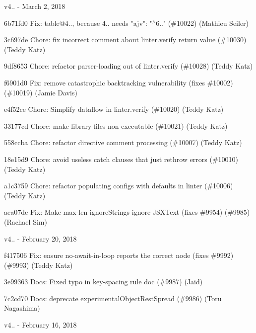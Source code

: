 v4.. -\/ March 2, 2018


\begin{DoxyItemize}
\item 6b71fd0 Fix\+: table@4.., because 4.. needs "{}ajv"{}\+: "{}\texorpdfstring{$^\wedge$}{\string^}6.."{} (\#10022) (Mathieu Seiler)
\item 3c697de Chore\+: fix incorrect comment about linter.\+verify return value (\#10030) (Teddy Katz)
\item 9df8653 Chore\+: refactor parser-\/loading out of linter.\+verify (\#10028) (Teddy Katz)
\item f6901d0 Fix\+: remove catastrophic backtracking vulnerability (fixes \#10002) (\#10019) (Jamie Davis)
\item e4f52ce Chore\+: Simplify dataflow in linter.\+verify (\#10020) (Teddy Katz)
\item 33177cd Chore\+: make library files non-\/executable (\#10021) (Teddy Katz)
\item 558ccba Chore\+: refactor directive comment processing (\#10007) (Teddy Katz)
\item 18e15d9 Chore\+: avoid useless catch clauses that just rethrow errors (\#10010) (Teddy Katz)
\item a1c3759 Chore\+: refactor populating configs with defaults in linter (\#10006) (Teddy Katz)
\item aea07dc Fix\+: Make max-\/len ignore\+Strings ignore JSXText (fixes \#9954) (\#9985) (Rachael Sim)
\end{DoxyItemize}

v4.. -\/ February 20, 2018


\begin{DoxyItemize}
\item f417506 Fix\+: ensure no-\/await-\/in-\/loop reports the correct node (fixes \#9992) (\#9993) (Teddy Katz)
\item 3e99363 Docs\+: Fixed typo in key-\/spacing rule doc (\#9987) (Jaid)
\item 7c2cd70 Docs\+: deprecate experimental\+Object\+Rest\+Spread (\#9986) (Toru Nagashima)
\end{DoxyItemize}

v4.. -\/ February 16, 2018


